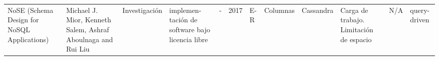 \begin{landscape}
\begin{longtable}{  p{2.1cm}| p{1.7cm}| l| p{1.8cm}| p{1.7cm}|  p{1.1cm}| p{1.2cm}| p{1.7cm}| p{1.9cm}| p{1.6cm}| p{1.5cm}| p{1.5cm}  }
		NoSE (Schema Design for NoSQL Applications) & Michael J. Mior, Kenneth Salem, Ashraf Aboulnaga and Rui Liu & Investigación & implemen-tación de software bajo licencia libre & - & 2017 & E-R & Columnas & Cassandra & Carga de trabajo. Limitación de espacio & N/A & query-driven \\
		
		
	\end{longtable}
	
\end{landscape}

